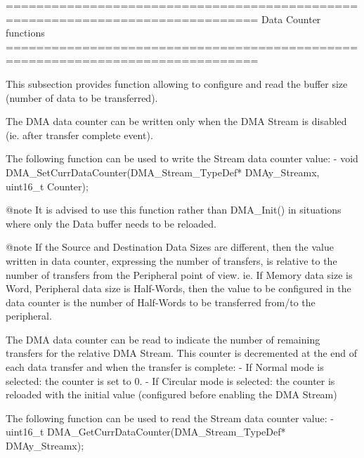 \begin{DoxyVerb} ===============================================================================
                           Data Counter functions
 ===============================================================================  

  This subsection provides function allowing to configure and read the buffer size
  (number of data to be transferred). 

  The DMA data counter can be written only when the DMA Stream is disabled 
  (ie. after transfer complete event).

  The following function can be used to write the Stream data counter value:
    - void DMA_SetCurrDataCounter(DMA_Stream_TypeDef* DMAy_Streamx, uint16_t Counter);

@note It is advised to use this function rather than DMA_Init() in situations where
      only the Data buffer needs to be reloaded.

@note If the Source and Destination Data Sizes are different, then the value written in
      data counter, expressing the number of transfers, is relative to the number of 
      transfers from the Peripheral point of view.
      ie. If Memory data size is Word, Peripheral data size is Half-Words, then the value
      to be configured in the data counter is the number of Half-Words to be transferred
      from/to the peripheral.

  The DMA data counter can be read to indicate the number of remaining transfers for
  the relative DMA Stream. This counter is decremented at the end of each data 
  transfer and when the transfer is complete: 
   - If Normal mode is selected: the counter is set to 0.
   - If Circular mode is selected: the counter is reloaded with the initial value
     (configured before enabling the DMA Stream)
   
  The following function can be used to read the Stream data counter value:
     - uint16_t DMA_GetCurrDataCounter(DMA_Stream_TypeDef* DMAy_Streamx);\end{DoxyVerb}
 

